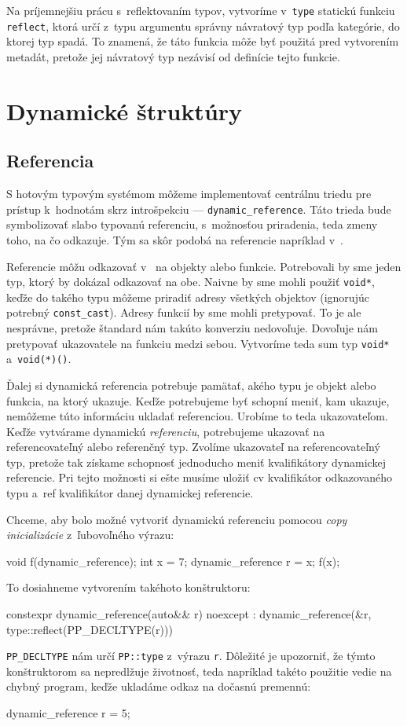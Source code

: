 Na príjemnejšiu prácu s~reflektovaním typov, vytvoríme v~\texttt{type} statickú funk\-ciu \texttt{reflect}, ktorá určí z~typu argumentu správny návratový typ podľa kategórie, do ktorej typ spadá. To znamená, že táto funk\-cia môže byť použitá pred vytvorením metadát, pretože jej návratový typ nezávisí od definície tejto funkcie.

\section{Dynamické štruktúry}

\subsection{Referencia}

S hotovým typovým systémom môžeme implementovať centrálnu triedu pre prístup k~hodnotám skrz introšpekciu --- \texttt{dynamic\_reference}. Táto trieda bude symbolizovať slabo typovanú referenciu, s~možnosťou priradenia, teda zmeny toho, na čo odkazuje. Tým sa skôr podobá na referencie napríklad v~\Csharp{}.

Referencie môžu odkazovať v~\Cpp{} na objekty alebo funkcie. Potrebovali by sme jeden typ, ktorý by dokázal odkazovať na obe. Naivne by sme mohli použiť \texttt{void*}, keďže do takého typu môžeme priradiť adresy všetkých objektov (ignorujúc potrebný \texttt{const\_cast}). Adresy funkcií by sme mohli pretypovať. To je ale nesprávne, pretože štandard nám takúto konverziu nedovoľuje. Dovoľuje nám pretypovať ukazovatele na funkciu medzi sebou. Vytvoríme teda sum typ \texttt{void*} a~\texttt{void(*)()}.

Ďalej si dynamická referencia potrebuje pamätať, akého typu je objekt alebo funkcia, na ktorý ukazuje. Keďže potrebujeme byť schopní meniť, kam ukazuje, nemôžeme túto informáciu ukladať referenciou. Urobíme to teda ukazovateľom. Keďže vytvárame dynamickú \emph{referenciu}, potrebujeme ukazovať na referencovateľný alebo referenčný typ. Zvolíme ukazovateľ na referencovateľný typ, pretože tak získame schopnosť jednoducho meniť kvalifikátory dynamickej referencie. Pri tejto možnosti si ešte musíme uložiť cv kvalifikátor odkazovaného typu a~ref kvalifikátor danej dynamickej referencie.

Chceme, aby bolo možné vytvoriť dynamickú referenciu pomocou \emph{copy inicializácie} z~ľubovoľného výrazu:
\begin{code}
void f(dynamic_reference);
int x = 7;
dynamic_reference r = x;
f(x);
\end{code}
To dosiahneme vytvorením takéhoto konštruktoru:
\begin{code}
constexpr dynamic_reference(auto&& r) noexcept
	: dynamic_reference(&r, type::reflect(PP_DECLTYPE(r)))
{}
\end{code}
\texttt{PP\_DECLTYPE} nám určí \texttt{PP::type} z~výrazu \texttt{r}. Dôležité je upozorniť, že týmto konštruktorom sa nepredlžuje životnosť, teda napríklad takéto použitie vedie na chybný program, keďže ukladáme odkaz na dočasnú premennú:
\begin{code}
dynamic_reference r = 5;
\end{code}

